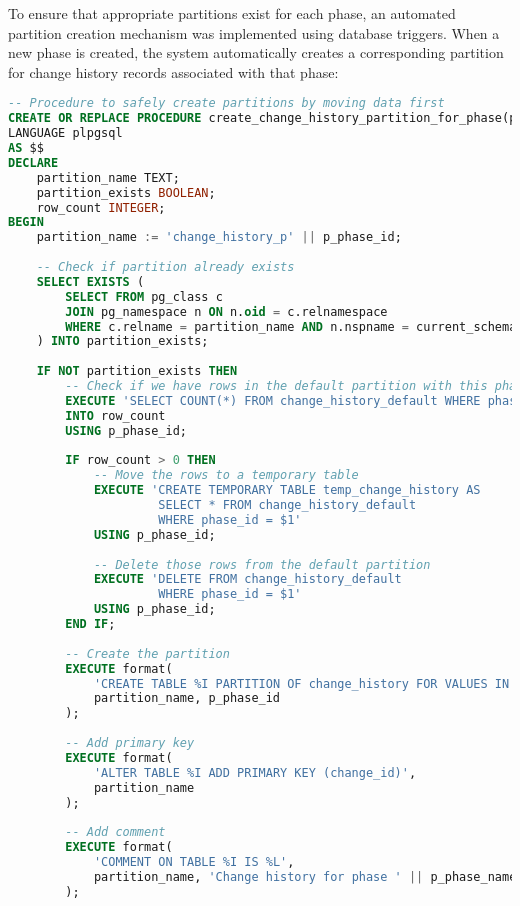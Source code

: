 To ensure that appropriate partitions exist for each phase, an automated partition creation mechanism was implemented using database triggers. When a new phase is created, the system automatically creates a corresponding partition for change history records associated with that phase:

\begin{lstlisting}[language=SQL, caption={Automatic Partition Creation}, label={lst:auto-partition-creation}]
-- Procedure to safely create partitions by moving data first
CREATE OR REPLACE PROCEDURE create_change_history_partition_for_phase(p_phase_id INTEGER, p_phase_name VARCHAR)
LANGUAGE plpgsql
AS $$
DECLARE
    partition_name TEXT;
    partition_exists BOOLEAN;
    row_count INTEGER;
BEGIN
    partition_name := 'change_history_p' || p_phase_id;
    
    -- Check if partition already exists
    SELECT EXISTS (
        SELECT FROM pg_class c
        JOIN pg_namespace n ON n.oid = c.relnamespace
        WHERE c.relname = partition_name AND n.nspname = current_schema()
    ) INTO partition_exists;
    
    IF NOT partition_exists THEN
        -- Check if we have rows in the default partition with this phase_id
        EXECUTE 'SELECT COUNT(*) FROM change_history_default WHERE phase_id = $1'
        INTO row_count
        USING p_phase_id;
        
        IF row_count > 0 THEN
            -- Move the rows to a temporary table
            EXECUTE 'CREATE TEMPORARY TABLE temp_change_history AS 
                     SELECT * FROM change_history_default 
                     WHERE phase_id = $1'
            USING p_phase_id;
            
            -- Delete those rows from the default partition
            EXECUTE 'DELETE FROM change_history_default 
                     WHERE phase_id = $1'
            USING p_phase_id;
        END IF;
        
        -- Create the partition
        EXECUTE format(
            'CREATE TABLE %I PARTITION OF change_history FOR VALUES IN (%L)',
            partition_name, p_phase_id
        );
        
        -- Add primary key
        EXECUTE format(
            'ALTER TABLE %I ADD PRIMARY KEY (change_id)',
            partition_name
        );
        
        -- Add comment
        EXECUTE format(
            'COMMENT ON TABLE %I IS %L',
            partition_name, 'Change history for phase ' || p_phase_name
        );
        

\end{lstlisting}
